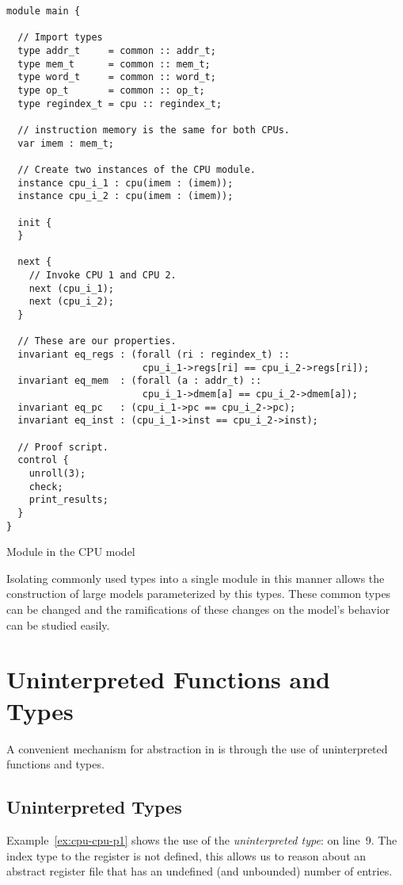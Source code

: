 \begin{uclidlisting}[htbp]
\begin{lstlisting}[language=uclid,style=uclidstyle]
module main {

  // Import types
  type addr_t     = common :: addr_t;
  type mem_t      = common :: mem_t;
  type word_t     = common :: word_t;
  type op_t       = common :: op_t;
  type regindex_t = cpu :: regindex_t;
  
  // instruction memory is the same for both CPUs.
  var imem : mem_t;

  // Create two instances of the CPU module.
  instance cpu_i_1 : cpu(imem : (imem));
  instance cpu_i_2 : cpu(imem : (imem));

  init {
  }

  next {
    // Invoke CPU 1 and CPU 2.
    next (cpu_i_1);
    next (cpu_i_2);
  }
  
  // These are our properties.
  invariant eq_regs : (forall (ri : regindex_t) :: 
                        cpu_i_1->regs[ri] == cpu_i_2->regs[ri]);
  invariant eq_mem  : (forall (a : addr_t) :: 
                        cpu_i_1->dmem[a] == cpu_i_2->dmem[a]);
  invariant eq_pc   : (cpu_i_1->pc == cpu_i_2->pc);
  invariant eq_inst : (cpu_i_1->inst == cpu_i_2->inst);

  // Proof script.
  control {
    unroll(3);
    check;
    print_results;
  }
}
\end{lstlisting}
\caption{Module  in the CPU model}
\label{ex:cpu-main}
\end{uclidlisting}


Isolating commonly used types into a single module in this manner allows the construction of large models parameterized by this types. These common types can be changed and the ramifications of these changes on the model's behavior can be studied easily.

\section{Uninterpreted Functions and Types}
A convenient mechanism for abstraction in \uclid{} is through the use of uninterpreted functions and types.

\subsection{Uninterpreted Types}
Example~\ref{ex:cpu-cpu-p1} shows the use of the \emph{uninterpreted type}:  on line~9. The index type to the register is not defined, this allows us to reason about an abstract register file that has an undefined (and unbounded) number of entries.

